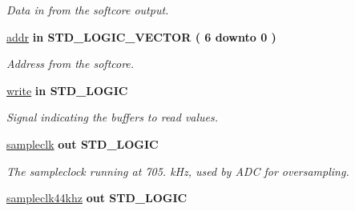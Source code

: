 \begin{DoxyCompactItemize}
\begin{DoxyCompactList}\small\item\em Data in from the softcore output. \end{DoxyCompactList}\item 
\hypertarget{classdac__Top_ad1620b7fc57dbb860b23d27c24034285}{\hyperlink{classdac__Top_ad1620b7fc57dbb860b23d27c24034285}{addr}  {\bfseries {\bfseries \textcolor{vhdlkeyword}{in}\textcolor{vhdlchar}{ }}} {\bfseries \textcolor{comment}{S\-T\-D\-\_\-\-L\-O\-G\-I\-C\-\_\-\-V\-E\-C\-T\-O\-R}\textcolor{vhdlchar}{ }\textcolor{vhdlchar}{(}\textcolor{vhdlchar}{ }\textcolor{vhdlchar}{ } \textcolor{vhdldigit}{6} \textcolor{vhdlchar}{ }\textcolor{vhdlchar}{ }\textcolor{vhdlchar}{ }\textcolor{vhdlkeyword}{downto}\textcolor{vhdlchar}{ }\textcolor{vhdlchar}{ }\textcolor{vhdlchar}{ } \textcolor{vhdldigit}{0} \textcolor{vhdlchar}{ }\textcolor{vhdlchar}{)}\textcolor{vhdlchar}{ }} }\label{classdac__Top_ad1620b7fc57dbb860b23d27c24034285}

\begin{DoxyCompactList}\small\item\em Address from the softcore. \end{DoxyCompactList}\item 
\hypertarget{classdac__Top_a042a830e6d62a56ff50a9a3e85ff86dd}{\hyperlink{classdac__Top_a042a830e6d62a56ff50a9a3e85ff86dd}{write}  {\bfseries {\bfseries \textcolor{vhdlkeyword}{in}\textcolor{vhdlchar}{ }}} {\bfseries \textcolor{comment}{S\-T\-D\-\_\-\-L\-O\-G\-I\-C}\textcolor{vhdlchar}{ }} }\label{classdac__Top_a042a830e6d62a56ff50a9a3e85ff86dd}

\begin{DoxyCompactList}\small\item\em Signal indicating the buffers to read values. \end{DoxyCompactList}\item 
\hypertarget{classdac__Top_aae112fd9041e6fcce9483ea8550d54f3}{\hyperlink{classdac__Top_aae112fd9041e6fcce9483ea8550d54f3}{sampleclk}  {\bfseries {\bfseries \textcolor{vhdlkeyword}{out}\textcolor{vhdlchar}{ }}} {\bfseries \textcolor{comment}{S\-T\-D\-\_\-\-L\-O\-G\-I\-C}\textcolor{vhdlchar}{ }} }\label{classdac__Top_aae112fd9041e6fcce9483ea8550d54f3}

\begin{DoxyCompactList}\small\item\em The sampleclock running at 705. k\-Hz, used by A\-D\-C for oversampling. \end{DoxyCompactList}\item 
\hypertarget{classdac__Top_a70a8575229cff595728858aea9bd6a65}{\hyperlink{classdac__Top_a70a8575229cff595728858aea9bd6a65}{sampleclk44khz}  {\bfseries {\bfseries \textcolor{vhdlkeyword}{out}\textcolor{vhdlchar}{ }}} {\bfseries \textcolor{comment}{S\-T\-D\-\_\-\-L\-O\-G\-I\-C}\textcolor{vhdlchar}{ }} }\label{classdac__Top_a70a8575229cff595728858aea9bd6a65}


\end{DoxyCompactItemize}
